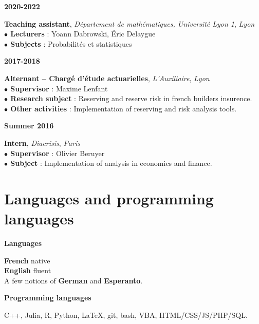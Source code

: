 \documentclass[a4paper,11pt]{article}
\newcommand{\tabcv}[2]{
\begin{minipage}[t]{0.12\linewidth}
\textbf{\footnotesize #1}
\end{minipage}\hfill
\begin{minipage}[t]{0.85\linewidth}
#2
\end{minipage}
\vspace{1em}
}
\begin{document}
\begin{flushleft}
\tabcv{2020-2022}{
\textbf{Teaching assistant}, \textit{Département de mathématiques, Université Lyon 1}, \textit{Lyon}\\[0.5em]
{\footnotesize
\textbf{$\bullet$ Lecturers} : Yoann Dabrowski, Éric Delaygue\\
\textbf{$\bullet$ Subjects} : Probabilités et statistiques\\
}
}

\tabcv{2017-2018}{
\textbf{Alternant -- Chargé d'étude actuarielles}, \textit{L'Auxiliaire}, \textit{Lyon}\\[0.5em]
{\footnotesize
\textbf{$\bullet$ Supervisor} : Maxime Lenfant\\
\textbf{$\bullet$ Research subject} : Reserving and reserve risk in french builders insurence.\\
\textbf{$\bullet$ Other activities} : Implementation of reserving and risk analysis tools.\\
}
}


\tabcv{Summer 2016}{
\textbf{Intern}, \textit{Diacrisis}, \textit{Paris}\\[0.5em]
{\footnotesize
\textbf{$\bullet$ Supervisor} : Olivier Beruyer\\
\textbf{$\bullet$ Subject} : Implementation of analysis in economics and finance. \\
}
}

\end{flushleft}


\section{Languages and programming languages}
\tabcv{Languages}{
\textbf{French} native\\ 
\textbf{English} fluent\\ 
A few notions of \textbf{German} and \textbf{Esperanto}.\\
}
\tabcv{Programming languages}{
C++, Julia, R, Python, \LaTeX, git, bash, VBA, HTML/CSS/JS/PHP/SQL.\\
}

\clearpage
\end{document}
